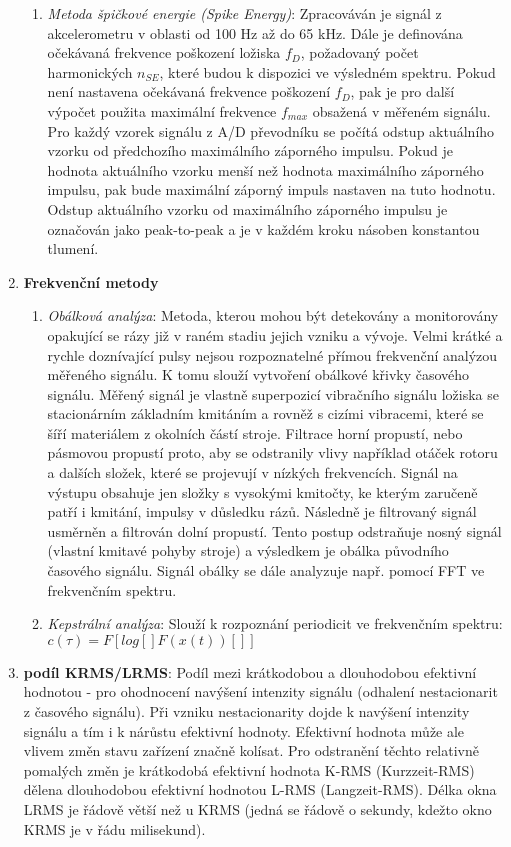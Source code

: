 \begin{enumerate}[label=(\alph*)]
\begin{enumerate}[label=(\roman*)]
\item \textit{Metoda špičkové energie (Spike Energy)}: Zpracováván je signál z akcelerometru v oblasti od 100 Hz až do 65 kHz. Dále je definována očekávaná frekvence poškození ložiska $ f_D $, požadovaný počet harmonických $ n_{SE} $, které budou k dispozici ve výsledném spektru. Pokud není nastavena očekávaná frekvence poškození $ f_D $, pak je pro další výpočet použita maximální frekvence $ f_{max} $ obsažená v měřeném signálu. Pro každý vzorek signálu z A/D převodníku se počítá odstup aktuálního vzorku od předchozího maximálního záporného impulsu. Pokud je hodnota aktuálního vzorku menší než hodnota maximálního záporného impulsu, pak bude maximální záporný impuls nastaven na tuto hodnotu. Odstup aktuálního vzorku od maximálního záporného impulsu je označován jako peak-to-peak a je v každém kroku násoben konstantou tlumení. \end{enumerate}
\item \textbf{Frekvenční metody}
\begin{enumerate}[label=(\roman*)]
\item \textit{Obálková analýza}: Metoda, kterou mohou být detekovány a monitorovány opakující se rázy již v raném stadiu jejich vzniku a vývoje. Velmi krátké a rychle doznívající pulsy nejsou rozpoznatelné přímou frekvenční analýzou
měřeného signálu. K tomu slouží vytvoření obálkové křivky časového signálu. Měřený signál je vlastně superpozicí vibračního signálu ložiska se stacionárním základním kmitáním a rovněž s cizími vibracemi, které se šíří materiálem z okolních částí stroje. Filtrace horní propustí, nebo pásmovou propustí proto, aby se odstranily vlivy například otáček rotoru a dalších složek, které se projevují v nízkých frekvencích. Signál na výstupu obsahuje jen složky s vysokými kmitočty, ke kterým zaručeně patří i kmitání, impulsy v důsledku rázů. Následně je filtrovaný signál usměrněn a filtrován dolní propustí. Tento postup odstraňuje nosný signál (vlastní kmitavé pohyby stroje) a výsledkem je obálka původního časového signálu. Signál obálky se dále analyzuje např. pomocí FFT ve frekvenčním spektru. 
\vspace{3cm}
\item \textit{Kepstrální analýza}: Slouží k rozpoznání periodicit ve frekvenčním spektru: $ c(\tau) = F[log[]F(x(t))[]] $ 
\end{enumerate}
\item \textbf{podíl KRMS/LRMS}: Podíl mezi krátkodobou a dlouhodobou efektivní hodnotou - pro ohodnocení navýšení intenzity signálu (odhalení nestacionarit z časového signálu). Při vzniku nestacionarity dojde k navýšení intenzity signálu a tím i k nárůstu efektivní hodnoty. Efektivní hodnota může ale vlivem změn stavu zařízení značně kolísat. Pro odstranění těchto relativně pomalých změn je krátkodobá efektivní hodnota K-RMS (Kurzzeit-RMS) dělena dlouhodobou efektivní hodnotou L-RMS (Langzeit-RMS). Délka okna LRMS je řádově větší než u KRMS (jedná se řádově o sekundy, kdežto okno KRMS je v řádu milisekund).
\end{enumerate}

